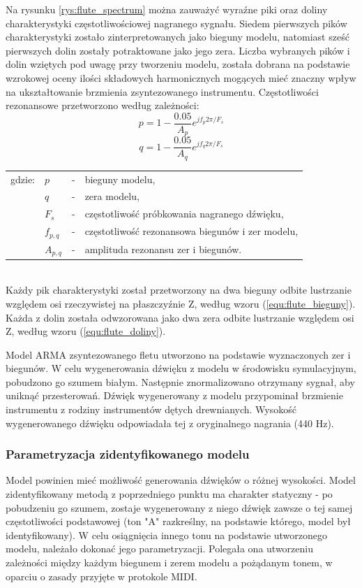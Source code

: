 Na rysunku \ref{rys:flute_spectrum} można zauważyć wyraźne piki oraz doliny charakterystyki częstotliwościowej nagranego sygnału. Siedem pierwszych pików charakterystyki zostało zinterpretowanych jako bieguny modelu, natomiast sześć pierwszych dolin zostały potraktowane jako jego zera. Liczba wybranych pików i dolin wziętych pod uwagę przy tworzeniu modelu, została dobrana na podstawie wzrokowej oceny ilości składowych harmonicznych mogących mieć znaczny wpływ na ukształtowanie brzmienia zsyntezowanego instrumentu. Częstotliwości rezonansowe przetworzono według zależności:
\begin{equation} \label{equ:flute_bieguny}
p = 1-\frac{0.05}{A_{p}}e^{jf_{p}2\pi/F_{s}}
\end{equation}
\begin{equation} \label{equ:flute_doliny}
q = 1-\frac{0.05}{A_{q}}e^{jf_{q}2\pi/F_{s}}
\end{equation}
\begin{tabular}{ l l l l}
	gdzie: & $p$ &  - & bieguny modelu, \\
	&	$q$ & - &  zera modelu, \\
	&	$F_{s}$ & - &  częstotliwość próbkowania nagranego dźwięku,\\
	&	$f_{p,q}$ & - &  częstotliwość rezonansowa biegunów i zer modelu, \\
	&	$A_{p,q}$ & - &  amplituda rezonansu zer i biegunów. \\
\end{tabular} \\

Każdy pik charakterystyki został przetworzony na dwa bieguny odbite lustrzanie względem osi rzeczywistej na płaszczyźnie Z, według wzoru (\ref{equ:flute_bieguny}). Każda z dolin została odwzorowana jako dwa zera odbite lustrzanie względem osi Z, według wzoru (\ref{equ:flute_doliny}).

Model ARMA zsyntezowanego fletu utworzono na podstawie wyznaczonych zer i biegunów. W celu wygenerowania dźwięku z modelu w środowisku symulacyjnym, pobudzono go szumem białym. Następnie znormalizowano otrzymany sygnał, aby uniknąć przesterowań. Dźwięk wygenerowany z modelu przypominał brzmienie instrumentu z rodziny instrumentów dętych drewnianych. Wysokość wygenerowanego dźwięku odpowiadała tej z oryginalnego nagrania (440 Hz).

\subsubsection{Parametryzacja zidentyfikowanego modelu}
Model powinien mieć możliwość generowania dźwięków o różnej wysokości. Model zidentyfikowany metodą z poprzedniego punktu ma charakter statyczny - po pobudzeniu go szumem, zostaje wygenerowany z niego dźwięk zawsze o tej samej częstotliwości podstawowej (ton "A" razkreślny, na podstawie którego, model był identyfikowany). W celu osiągnięcia innego tonu na podstawie utworzonego modelu, należało dokonać jego parametryzacji. Polegała ona utworzeniu zależności między każdym biegunem i zerem modelu a pożądanym tonem, w oparciu o zasady przyjęte w protokole MIDI.


